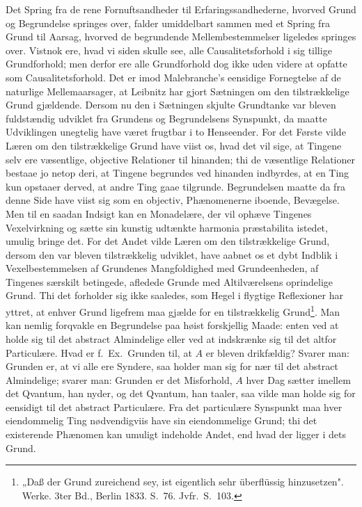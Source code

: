 \documentclass[12pt]{book}
\newcommand{\opage}[1]{\marginnote{\footnotesize\textit{[#1]}}}
\begin{document}
Det Spring fra de rene Fornuftsandheder til Erfaringssandhederne, hvorved Grund og
Begrundelse springes over, falder umiddelbart sammen med et Spring fra Grund til
Aarsag, hvorved de begrundende Mellembestemmelser ligeledes springes over. Vistnok
ere, hvad vi siden skulle see, alle Causalitetsforhold i sig tillige Grundforhold;
men derfor ere alle Grundforhold dog ikke uden videre at opfatte som
Causalitetsforhold. Det er imod Malebranche's eensidige Fornegtelse af de naturlige
Mellemaarsager, at Leibnitz har gjort Sætningen om den tilstrækkelige Grund gjældende.
Dersom nu den i Sætningen skjulte Grundtanke var bleven fuldstændig udviklet fra
Grundens og Begrundelsens Synspunkt, da maatte Udviklingen unegtelig have været
frugtbar i to Henseender. For det Første vilde Læren om den tilstrækkelige
\opage{102} Grund have viist os, hvad det vil sige, at Tingene selv ere væsentlige, objective
Relationer til hinanden; thi de væsentlige Relationer bestaae jo netop deri, at
Tingene begrundes ved hinanden indbyrdes, at en Ting kun opstaaer derved, at andre
Ting gaae tilgrunde. Begrundelsen maatte da fra denne Side have viist sig som en
objectiv, Phænomenerne iboende, Bevægelse. Men til en saadan Indsigt kan en
Monadelære, der vil ophæve Tingenes Vexelvirkning og sætte sin kunstig udtænkte
harmonia præstabilita istedet, umulig bringe det. For det Andet vilde Læren om den
tilstrækkelige Grund, dersom den var bleven tilstrækkelig udviklet, have aabnet os et
dybt Indblik i Vexelbestemmelsen af Grundenes Mangfoldighed med Grundeenheden, af
Tingenes særskilt betingede, afledede Grunde med Altilværelsens oprindelige Grund. Thi
det forholder sig ikke saaledes, som Hegel i flygtige Reflexioner har yttret, at
enhver Grund ligefrem maa gjælde for en tilstrækkelig Grund\footnote{„Daß der Grund
zureichend sey, ist eigentlich sehr überflüssig hinzusetzen". Werke. 3ter Bd., Berlin
1833. S.~76. Jvfr.\ S.~103.}. Man kan nemlig forqvakle en Begrundelse paa høist
forskjellig Maade: enten ved at holde sig til det abstract Almindelige eller ved at
indskrænke sig til det altfor Particulære. Hvad er f.\ Ex.\ Grunden til, at $A$ er
bleven drikfældig? Svarer man: Grunden er, at vi alle ere Syndere, saa holder man sig
for nær til det abstract Almindelige; svarer man: Grunden er det Misforhold, $A$ hver
Dag sætter imellem det Qvantum, han nyder, og det Qvantum, han taaler, saa vilde man
holde sig for eensidigt til det abstract Particulære. Fra det particulære Synspunkt
maa hver eiendommelig Ting nødvendigviis have sin eiendommelige Grund; thi det
existerende Phænomen kan umuligt indeholde Andet, end hvad der ligger i dets Grund.
\end{document}
